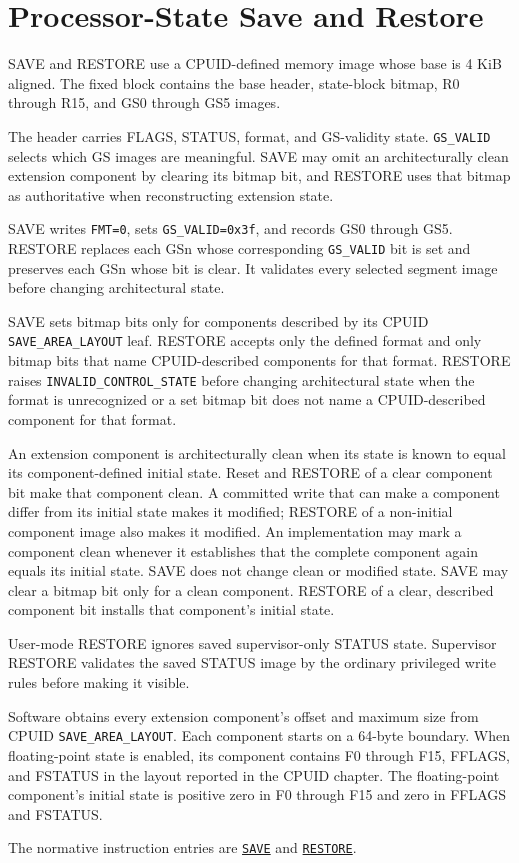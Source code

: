 \clearpage
\section{Processor-State Save and Restore}\label{page:processor-state-save-and-restore}

SAVE and RESTORE use a CPUID-defined memory image whose base is 4 KiB aligned. The fixed block contains the base
header, state-block bitmap, R0 through R15, and GS0 through GS5 images.

The header carries FLAGS, STATUS, format, and GS-validity state. \texttt{GS\_VALID} selects which GS images are
meaningful. SAVE may omit an architecturally clean extension component by clearing its bitmap bit, and RESTORE uses
that bitmap as authoritative when reconstructing extension state.

SAVE writes \texttt{FMT=0}, sets \texttt{GS\_VALID=0x3f}, and records GS0 through GS5. RESTORE replaces each GSn
whose corresponding \texttt{GS\_VALID} bit is set and preserves each GSn whose bit is clear. It validates every
selected segment image before changing architectural state.

SAVE sets bitmap bits only for components described by its CPUID \texttt{SAVE\_AREA\_LAYOUT} leaf. RESTORE accepts
only the defined format and only bitmap bits that name CPUID-described components for that format. RESTORE raises
\texttt{INVALID\_CONTROL\_STATE} before changing architectural state when the format is unrecognized or a set
bitmap bit does not name a CPUID-described component for that format.

An extension component is architecturally clean when its state is known to equal its component-defined initial
state. Reset and RESTORE of a clear component bit make that component clean. A committed write that can make a
component differ from its initial state makes it modified; RESTORE of a non-initial component image also makes it
modified. An implementation may mark a component clean whenever it establishes that the complete component again
equals its initial state. SAVE does not change clean or modified state. SAVE may clear a bitmap bit only for a clean
component. RESTORE of a clear, described component bit installs that component's initial state.

User-mode RESTORE ignores saved supervisor-only STATUS state. Supervisor RESTORE validates the saved STATUS image by
the ordinary privileged write rules before making it visible.

Software obtains every extension component's offset and maximum size from CPUID
\texttt{SAVE\_AREA\_LAYOUT}. Each component starts on a 64-byte boundary. When floating-point state is enabled,
its component contains F0 through F15, FFLAGS, and FSTATUS in the layout reported in the CPUID chapter. The
floating-point component's initial state is positive zero in F0 through F15 and zero in FFLAGS and FSTATUS.

The normative instruction entries are
\hyperref[instr:save]{\texttt{SAVE}} and
\hyperref[instr:restore]{\texttt{RESTORE}}.\par


